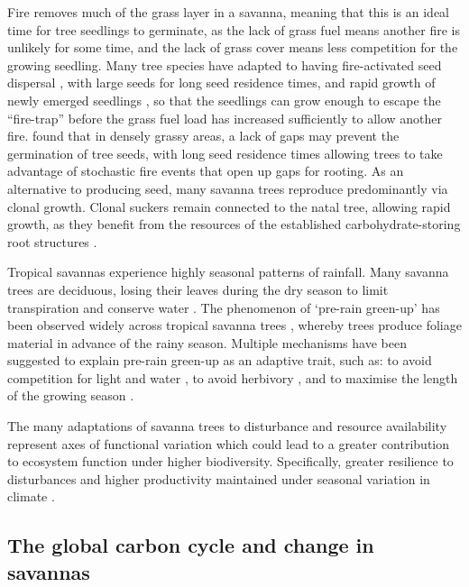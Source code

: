 \begin{refsection}
Fire removes much of the grass layer in a savanna, meaning that this is an ideal time for tree seedlings to germinate, as the lack of grass fuel means another fire is unlikely for some time, and the lack of grass cover means less competition for the growing seedling. Many tree species have adapted to having fire-activated seed dispersal \citep{Veldman2015}, with large seeds for long seed residence times, and rapid growth of newly emerged seedlings \citep{Daibes2019}, so that the seedlings can grow enough to escape the ``fire-trap'' before the grass fuel load has increased sufficiently to allow another fire. \citet{Wakeling2015} found that in densely grassy areas, a lack of gaps may prevent the germination of tree seeds, with long seed residence times allowing trees to take advantage of stochastic fire events that open up gaps for rooting. As an alternative to producing seed, many savanna trees reproduce predominantly via clonal growth. Clonal suckers remain connected to the natal tree, allowing rapid growth, as they benefit from the resources of the established carbohydrate-storing root structures \citep{Bond2003}.

Tropical savannas experience highly seasonal patterns of rainfall. Many savanna trees are deciduous, losing their leaves during the dry season to limit transpiration and conserve water \citep{Dahlin2016}. The phenomenon of `pre-rain green-up' has been observed widely across tropical savanna trees \citep{Archibald2007, Borchert1994, Williams1997}, whereby trees produce foliage material in advance of the rainy season. Multiple mechanisms have been suggested to explain pre-rain green-up as an adaptive trait, such as: to avoid competition for light and water \citep{Ryan2017}, to avoid herbivory \citep{Aide1988}, and to maximise the length of the growing season \citep{Scholes1993}. 

The many adaptations of savanna trees to disturbance and resource availability represent axes of functional variation which could lead to a greater contribution to ecosystem function under higher biodiversity. Specifically, greater resilience to disturbances and higher productivity maintained under seasonal variation in climate \citep{Diaz2001, Mori2012}.

\subsection{The global carbon cycle and change in savannas}
\label{background:ssec:carbon}


\end{refsection}
